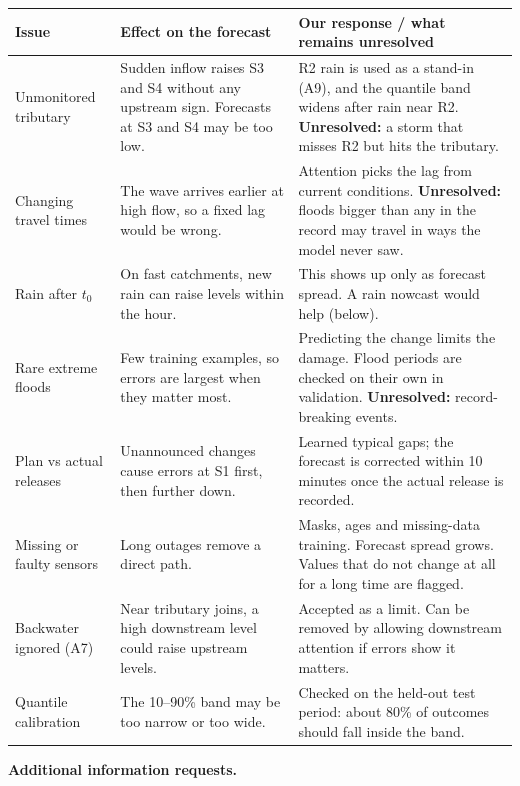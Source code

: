 \documentclass[11pt,a4paper]{article}
\begin{document}
\begin{longtable}{|L{3cm}|L{5.6cm}|L{7cm}|}
\hline
\textbf{Issue} & \textbf{Effect on the forecast} & \textbf{Our response / what remains unresolved} \\ \hline
\endhead
Unmonitored tributary & Sudden inflow raises S3 and S4 without any upstream sign. Forecasts at S3 and S4 may be too low. & R2 rain is used as a stand-in (A9), and the quantile band widens after rain near R2. \textbf{Unresolved:} a storm that misses R2 but hits the tributary. \\ \hline
Changing travel times & The wave arrives earlier at high flow, so a fixed lag would be wrong. & Attention picks the lag from current conditions. \textbf{Unresolved:} floods bigger than any in the record may travel in ways the model never saw. \\ \hline
Rain after $t_0$ & On fast catchments, new rain can raise levels within the hour. & This shows up only as forecast spread. A rain nowcast would help (below). \\ \hline
Rare extreme floods & Few training examples, so errors are largest when they matter most. & Predicting the change limits the damage. Flood periods are checked on their own in validation. \textbf{Unresolved:} record-breaking events. \\ \hline
Plan vs actual releases & Unannounced changes cause errors at S1 first, then further down. & Learned typical gaps; the forecast is corrected within 10 minutes once the actual release is recorded. \\ \hline
Missing or faulty sensors & Long outages remove a direct path. & Masks, ages and missing-data training. Forecast spread grows. Values that do not change at all for a long time are flagged. \\ \hline
Backwater ignored (A7) & Near tributary joins, a high downstream level could raise upstream levels. & Accepted as a limit. Can be removed by allowing downstream attention if errors show it matters. \\ \hline
Quantile calibration & The 10--90\% band may be too narrow or too wide. & Checked on the held-out test period: about 80\% of outcomes should fall inside the band. \\ \hline
\end{longtable}

\textbf{Additional information requests.}
\end{document}
